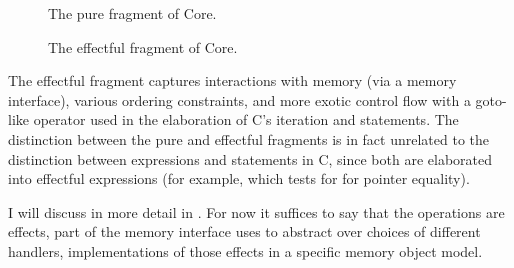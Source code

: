 \begin{figure*}[tp]
    \ContinuedFloat*
    \raggedright%
    \small%
    \cngrammarcompressed{\textwidth}{%
        \cnpce{}\cninterrule{}
        \cnname{}\cninterrule{}
        \cncpat{}\cninterrule{}
        \cnctor{}\cnafterlastrule{}
    }
    \caption{The pure fragment of Core.}\label{fig:pure-core-grammar}
\end{figure*}

\begin{figure*}[tp]
    \ContinuedFloat{}
    \raggedright%
    \small%
    \cngrammarcompressed{\textwidth}{%
        \cncore{}\cninterrule{}
        \cncoreXXctxt{}\cninterrule{}
        \cncmemop{}\cninterrule{}
        \cncaction{}\cnafterlastrule{}
    }
    \caption{The effectful fragment of Core.}\label{fig:effectful-core-grammar}
\end{figure*}

The effectful fragment captures interactions with memory (via a memory
interface), various ordering constraints, and more exotic control flow with a
goto-like operator used in the elaboration of C's iteration and 
statements. The distinction between the pure and effectful fragments is in
fact unrelated to the distinction between expressions and statements in C,
since both are elaborated into effectful expressions (for example,
 which tests for for pointer equality).

I will discuss  in more detail in %
. For now it suffices to say that the
operations are effects, part of the memory interface  uses to abstract
over choices of different handlers, implementations of those effects in a
specific memory object model.

